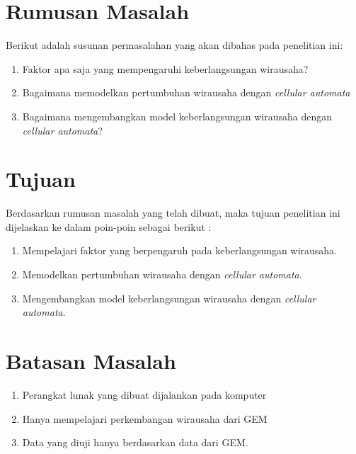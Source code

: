 





\section{Rumusan Masalah}
\label{sec:rumusan}
Berikut adalah susunan permasalahan yang akan dibahas pada penelitian ini:


\begin{enumerate}
	\item Faktor apa saja yang mempengaruhi keberlangsungan wirausaha?
	\item Bagaimana memodelkan pertumbuhan wirausaha dengan \textit{cellular automata}
	\item Bagaimana mengembangkan model keberlangsungan wirausaha dengan \textit{cellular automata}?
\end{enumerate}



\section{Tujuan}
\label{sec:tujuan}
Berdasarkan rumusan masalah yang telah dibuat, maka tujuan penelitian ini dijelaskan ke dalam poin-poin sebagai berikut :


\begin{enumerate}
	\item Mempelajari faktor yang berpengaruh pada keberlangsungan wirausaha.
	\item Memodelkan pertumbuhan wirausaha dengan \textit{cellular automata}.
	\item Mengembangkan model keberlangsungan wirausaha dengan \textit{cellular automata}.
\end{enumerate}

\section{Batasan Masalah}
\label{sec:batasan}
\begin{enumerate}
	\item Perangkat lunak yang dibuat dijalankan pada komputer
	\item Hanya mempelajari perkembangan wirausaha dari GEM
	\item Data yang diuji hanya berdasarkan data dari GEM.
\end{enumerate}


